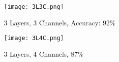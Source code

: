 \documentclass[a4paper]{article}
\begin{document}
\begin{figure}[h]
\centerline{\texttt{[image: 3L3C.png]}}
\caption{3 Layers, 3 Channels, Accuracy: 92\%}\label{placeholder}
\end{figure}

\begin{figure}[h]
\centerline{\texttt{[image: 3L4C.png]}}
\caption{3 Layers, 4 Channels, 87\%}\label{placeholder}
\end{figure}
\fi





\end{document}
